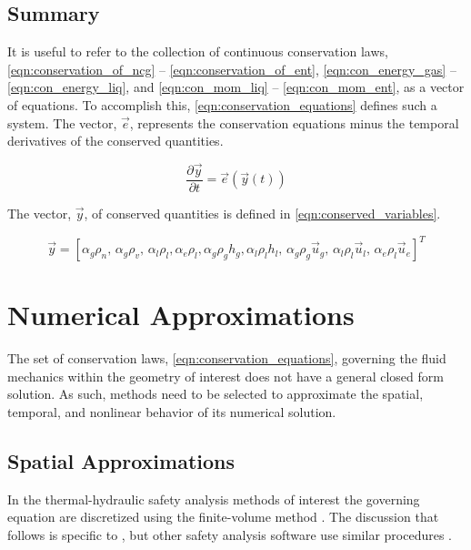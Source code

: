 \subsection{Summary}
\label{subsect:summary}

It is useful to refer to the collection of continuous conservation laws, \eqref{eqn:conservation_of_ncg} -- \eqref{eqn:conservation_of_ent}, \eqref{eqn:con_energy_gas} -- \eqref{eqn:con_energy_liq}, and \eqref{eqn:con_mom_liq} -- \eqref{eqn:con_mom_ent}, as a vector of equations.
To accomplish this, \eqref{eqn:conservation_equations} defines such a system.
The vector, $\vec{e}$, represents the conservation equations minus the temporal derivatives of the conserved quantities.

\begin{equation}
\label{eqn:conservation_equations}
\frac{\partial \vec{y} }{\partial t} = \vec{e}(\vec{y}(t))
\end{equation}

The vector, $\vec{y}$, of conserved quantities is defined in \eqref{eqn:conserved_variables}.

\begin{equation}
\label{eqn:conserved_variables}
\vec{y} = [\alpha_g \rho_n,\, \alpha_g \rho_v,\, \alpha_l \rho_l, \alpha_e \rho_l, \alpha_g \rho_g h_g, \alpha_l \rho_l h_l,\, \alpha_g \rho_g \vec{u}_g,\, \alpha_l \rho_l \vec{u}_l,\, \alpha_e \rho_l \vec{u}_e]^{T}
\end{equation}

\section{Numerical Approximations}
\label{sect:numeric_approximation}
The set of conservation laws, \eqref{eqn:conservation_equations}, governing the fluid mechanics within the geometry of interest does not have a general closed form solution.
As such, methods need to be selected to approximate the spatial, temporal, and nonlinear behavior of its numerical solution.

\subsection{Spatial Approximations}
\label{subsect:spatial_approx}
In the thermal-hydraulic safety analysis methods of interest the governing equation are discretized using the finite-volume method \cite{LeVeque2002}.
The discussion that follows is specific to \cobra{}, but other safety analysis software use similar procedures \cite{RELAP,TRACE}.

